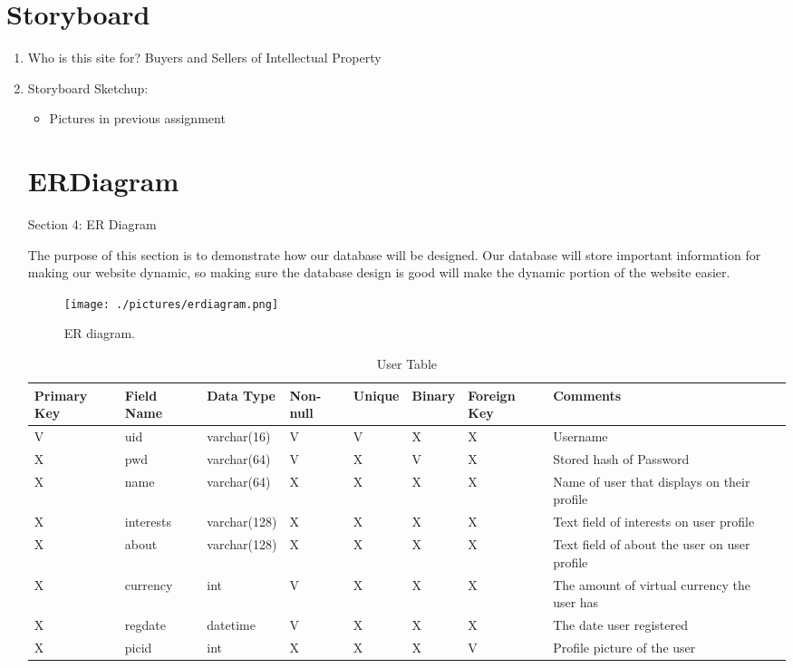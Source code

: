 \documentclass[]{article}
\begin{document}
\section{Storyboard}
	\begin{enumerate}
		\item Who is this site for? 
		Buyers and Sellers of Intellectual Property
		\item Storyboard Sketchup:
		\begin{itemize}
			\item Pictures in previous assignment
		\end{itemize}

	\section{ERDiagram}
	Section 4: ER Diagram

	The purpose of this section is to demonstrate how our database will be designed. Our database will store
	important information for making our website dynamic, so making sure the database design is good will
	make the dynamic portion of the website easier.

	\begin{figure}
		\texttt{[image: ./pictures/erdiagram.png]}
		\caption{ER diagram.}
		\label{fig:ERDiagram}
	\end{figure}	

	\begin{table}[!h]
	\begin{tabular}{|p{1cm}|p{1cm}|p{2cm}|p{1cm}|p{1cm}|p{1cm}|p{1cm}|p{1cm}|p{4cm}|}
		\hline  Primary Key & Field Name & Data Type & Non-null & Unique & Binary & Foreign Key & Comments \\
		\hline V & uid & varchar(16) & V & V & X & X & Username\\
		\hline X & pwd & varchar(64) & V & X & V & X & Stored hash of Password\\
		\hline X & name & varchar(64) & X & X & X & X & Name of user that displays on their profile\\
		\hline X & interests & varchar(128) & X & X & X & X & Text field of interests on user profile\\
		\hline X & about & varchar(128) & X & X & X & X & Text field of about the user on user profile\\
		\hline X & currency & int & V & X & X & X & The amount of virtual currency the user has\\
		\hline X & regdate & datetime & V & X & X & X & The date user registered\\
		\hline X & picid & int & X & X & X & V & Profile picture of the user\\
	\end{tabular}
	\caption{User Table}
	\end{table}


\end{enumerate}
\end{document}
